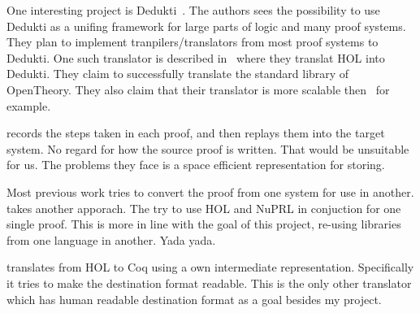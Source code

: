 One interesting project is Dedukti~\cite{assaf2016dedukti}. The authors sees
the possibility to use Dedukti as a unifing framework for large parts of logic
and many proof systems. They plan to implement tranpilers/translators from most
proof systems to Dedukti. One such translator is described
in~\cite{assaf2015translating} where they translat HOL into Dedukti. They claim
to successfully translate the standard library of OpenTheory. %
They also claim that their translator is more scalable
then~\cite{obua2006importing} for example.

\cite{obua2006importing} records the steps taken in each proof, and then
replays them into the target system. No regard for how the source proof is
written. That would be unsuitable for us. The problems they face is a space
efficient representation for storing.

Most previous work tries to convert the proof from one system for use in
another. \cite{felty1997hybrid} takes another apporach. The try to use HOL and
NuPRL in conjuction for one single proof. This is more in line with the goal of
this project, re-using libraries from one language in another. Yada yada.

\cite{denney2000prototype} translates from HOL to Coq using a own intermediate
representation. Specifically it tries to make the destination format readable.
This is the only other translator which has human readable destination format
as a goal besides my project.

